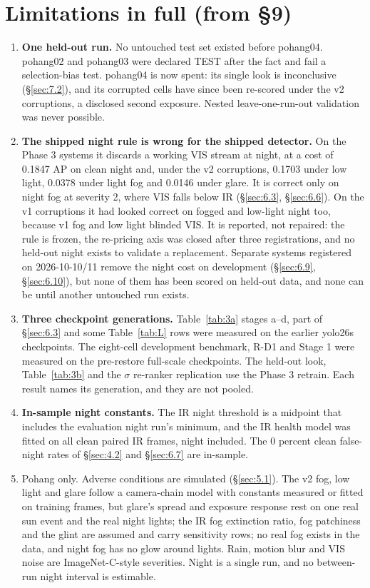 \documentclass[10pt]{article}
\begin{document}
\section{Limitations in full (from \S9)}\label{app:L}
\begin{enumerate}
\item \textbf{One held-out run.} No untouched test set existed before pohang04. pohang02 and pohang03 were declared TEST after the fact and fail a selection-bias test. pohang04 is now spent: its single look is inconclusive (\S\ref{sec:7.2}), and its corrupted cells have since been re-scored under the v2 corruptions, a disclosed second exposure. Nested leave-one-run-out validation was never possible.
\item \textbf{The shipped night rule is wrong for the shipped detector.} On the Phase 3 systems it discards a working VIS stream at night, at a cost of 0.1847 AP on clean night and, under the v2 corruptions, 0.1703 under low light, 0.0378 under light fog and 0.0146 under glare. It is correct only on night fog at severity 2, where VIS falls below IR (\S\ref{sec:6.3}, \S\ref{sec:6.6}). On the v1 corruptions it had looked correct on fogged and low-light night too, because v1 fog and low light blinded VIS. It is reported, not repaired: the rule is frozen, the re-pricing axis was closed after three registrations, and no held-out night exists to validate a replacement. Separate systems registered on 2026-10-10/11 remove the night cost on development (\S\ref{sec:6.9}, \S\ref{sec:6.10}), but none of them has been scored on held-out data, and none can be until another untouched run exists.
\item \textbf{Three checkpoint generations.} Table~\ref{tab:3a} stages a--d, part of \S\ref{sec:6.3} and some Table~\ref{tab:L} rows were measured on the earlier yolo26s checkpoints. The eight-cell development benchmark, R-D1 and Stage 1 were measured on the pre-restore full-scale checkpoints. The held-out look, Table~\ref{tab:3b} and the $\sigma$ re-ranker replication use the Phase 3 retrain. Each result names its generation, and they are not pooled.
\item \textbf{In-sample night constants.} The IR night threshold is a midpoint that includes the evaluation night run's minimum, and the IR health model was fitted on all clean paired IR frames, night included. The 0 percent clean false-night rates of \S\ref{sec:4.2} and \S\ref{sec:6.7} are in-sample.
\item Pohang only. Adverse conditions are simulated (\S\ref{sec:5.1}). The v2 fog, low light and glare follow a camera-chain model with constants measured or fitted on training frames, but glare's spread and exposure response rest on one real sun event and the real night lights; the IR fog extinction ratio, fog patchiness and the glint are assumed and carry sensitivity rows; no real fog exists in the data, and night fog has no glow around lights. Rain, motion blur and VIS noise are ImageNet-C-style severities. Night is a single run, and no between-run night interval is estimable.

\end{enumerate}
\end{document}
